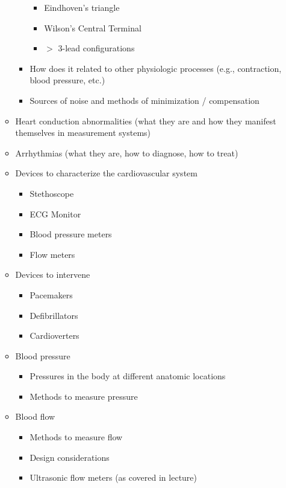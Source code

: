 \documentclass[11pt]{article}
\begin{document}
\begin{itemize}
\begin{itemize}
\begin{itemize}
        \begin{itemize}
            \item Eindhoven's triangle
            \item Wilson's Central Terminal
            \item $>$ 3-lead configurations
        \end{itemize}
        \item How does it related to other physiologic processes (e.g., contraction, blood pressure, etc.)
        \item Sources of noise and methods of minimization / compensation
    \end{itemize}
    \item Heart conduction abnormalities (what they are and how they manifest themselves in measurement systems)
    \item Arrhythmias (what they are, how to diagnose, how to treat)
    \item Devices to characterize the cardiovascular system
    \begin{itemize}
        \item Stethoscope
        \item ECG Monitor
        \item Blood pressure meters
        \item Flow meters
    \end{itemize}
    \item Devices to intervene
    \begin{itemize}
        \item Pacemakers
        \item Defibrillators
        \item Cardioverters
    \end{itemize}
    \item Blood pressure 
    \begin{itemize}
        \item Pressures in the body at different anatomic locations
        \item Methods to measure pressure
    \end{itemize}
    \item Blood flow
    \begin{itemize}
        \item Methods to measure flow
        \item Design considerations
        \item Ultrasonic flow meters (as covered in lecture)
    \end{itemize}

\end{itemize}
\end{itemize}
\end{document}

